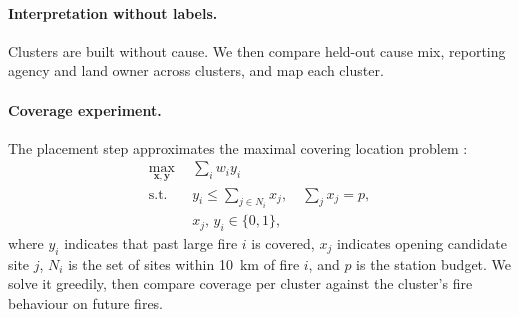 \documentclass[10pt,twocolumn,letterpaper]{article}
\begin{document}
\paragraph{Interpretation without labels.} Clusters are built without cause. We then compare held-out cause mix, reporting agency and land owner across clusters, and map each cluster.

\paragraph{Coverage experiment.} The placement step approximates the maximal covering location problem \cite{church1974}:
\begin{equation}
\begin{aligned}
\max_{\mathbf{x},\mathbf{y}}\ \ & \textstyle\sum_i w_i y_i\\
\text{s.t.}\ \ & y_i \le \textstyle\sum_{j\in N_i} x_j,\quad \textstyle\sum_j x_j = p,\\
& x_j,\,y_i\in\{0,1\},
\end{aligned}
\end{equation}
where $y_i$ indicates that past large fire $i$ is covered, $x_j$ indicates opening candidate site $j$, $N_i$ is the set of sites within 10~km of fire $i$, and $p$ is the station budget. We solve it greedily, then compare coverage per cluster against the cluster's fire behaviour on future fires.

\end{document}
